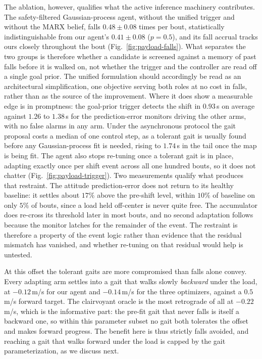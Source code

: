 \documentclass[letterpaper, 10 pt, conference]{ieeeconf}  %
\begin{document}
The ablation, however, qualifies what the active inference machinery contributes.
The safety-filtered Gaussian-process agent, without the unified trigger and without the MARX belief, falls $0.48 \pm 0.08$ times per bout, statistically indistinguishable from our agent's $0.41 \pm 0.08$ ($p = 0.5$), and its fall accrual tracks ours closely throughout the bout (Fig.~\ref{fig:payload-falls}).
What separates the two groups is therefore whether a candidate is screened against a memory of past falls before it is walked on, not whether the trigger and the controller are read off a single goal prior.
The unified formulation should accordingly be read as an architectural simplification, one objective serving both roles at no cost in falls, rather than as the source of the improvement.
Where it does show a measurable edge is in promptness: the goal-prior trigger detects the shift in $0.93$\,s on average against $1.26$ to $1.38$\,s for the prediction-error monitors driving the other arms, with no false alarms in any arm.
Under the asynchronous protocol the gait proposal costs a median of one control step, as a tolerant gait is usually found before any Gaussian-process fit is needed, rising to $1.74$\,s in the tail once the map is being fit.
The agent also stops re-tuning once a tolerant gait is in place, adapting exactly once per shift event across all one hundred bouts, so it does not chatter (Fig.~\ref{fig:payload-trigger}).
Two measurements qualify what produces that restraint.
The attitude prediction-error does not return to its healthy baseline: it settles about $17\%$ above the pre-shift level, within $10\%$ of baseline on only $5\%$ of bouts, since a load held off-center is never quite free.
The accumulator does re-cross its threshold later in most bouts, and no second adaptation follows because the monitor latches for the remainder of the event.
The restraint is therefore a property of the event logic rather than evidence that the residual mismatch has vanished, and whether re-tuning on that residual would help is untested.

At this offset the tolerant gaits are more compromised than falls alone convey.
Every adapting arm settles into a gait that walks slowly \emph{backward} under the load, at $-0.12$\,m/s for our agent and $-0.14$\,m/s for the three optimizers, against a $0.5$\,m/s forward target.
The clairvoyant oracle is the most retrograde of all at $-0.22$\,m/s, which is the informative part: the pre-fit gait that never falls is itself a backward one, so within this parameter subset no gait both tolerates the offset and makes forward progress.
The benefit here is thus strictly falls avoided, and reaching a gait that walks forward under the load is capped by the gait parameterization, as we discuss next.
\end{document}
